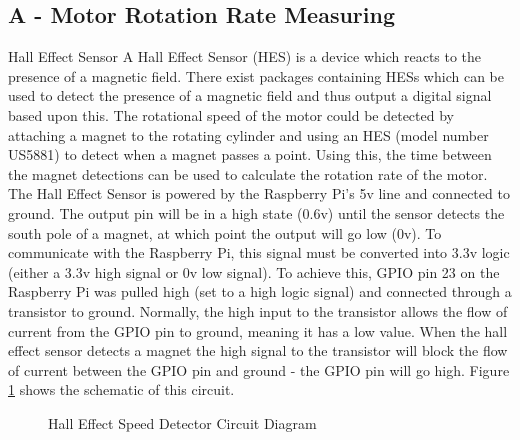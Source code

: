 \documentclass[twoside,a4]{report}
\def\br{\newline \newline \noindent}
\begin{document}
\subsection{A - Motor Rotation Rate Measuring}
\large Hall Effect Sensor \normalsize \br
A Hall Effect Sensor (HES) is a device which reacts to the presence of a magnetic field. There exist packages containing HESs which can be used to detect the presence of a magnetic field and thus output a digital signal based upon this. The rotational speed of the motor could be detected by attaching a magnet to the rotating cylinder and using an HES (model number US5881) to detect when a magnet passes a point. Using this, the time between the magnet detections can be used to calculate the rotation rate of the motor. \br
The Hall Effect Sensor is powered by the Raspberry Pi's 5v line and connected to ground. The output pin will be in a high state (0.6v) until the sensor detects the south pole of a magnet, at which point the output will go low (0v). To communicate with the Raspberry Pi, this signal must be converted into 3.3v logic (either a 3.3v high signal or 0v low signal). To achieve this, GPIO pin 23 on the Raspberry Pi was pulled high (set to a high logic signal) and connected through a transistor to ground. Normally, the high input to the transistor allows the flow of current from the GPIO pin to ground, meaning it has a low value. When the hall effect sensor detects a magnet the high signal to the transistor will block the flow of current between the GPIO pin and ground - the GPIO pin will go high. Figure \ref{circhall} shows the schematic of this circuit. \newline
\begin{figure}[!htb]
	\centering
	\caption{Hall Effect Speed Detector Circuit Diagram}
	\label{circhall}
\end{figure} \newline  \noindent
\end{document}
